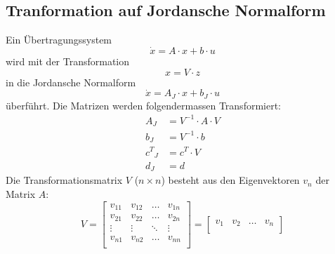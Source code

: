\subsection{Tranformation auf Jordansche Normalform}
Ein Übertragungssystem 
\[ \dot{x}=A\cdot x +  b \cdot u \]
wird mit der Transformation  
\[ x=V\cdot z \]
in die Jordansche Normalform 
\[ \dot{x}=A_J\cdot x +  b_J \cdot u \]
überführt. Die Matrizen werden folgendermassen Transformiert:
\[\begin{aligned}
	A_J &= V^{-1}\cdot A \cdot V	\\	
	b_J &= V^{-1}\cdot b	\\	
	{c^T}_J &= c^T\cdot V	\\	
	d_J &= d
\end{aligned}\]
Die Transformationsmatrix $V$ ($n\times n$) besteht aus den Eigenvektoren $v_n$ der Matrix $A$:
\[
	V = \begin{bmatrix}
		 v_{11} & v_{12} & \ldots & v_{1n}\\
		 v_{21} & v_{22} & \ldots & v_{2n}\\
		 \vdots		& \vdots	 & \ddots & \vdots\\
		 v_{n1} & v_{n2} & \ldots & v_{nn}\\	 
		\end{bmatrix} =
		\begin{bmatrix}
			v_1 & v_2 & \ldots & v_n \\
		\end{bmatrix}	
\]